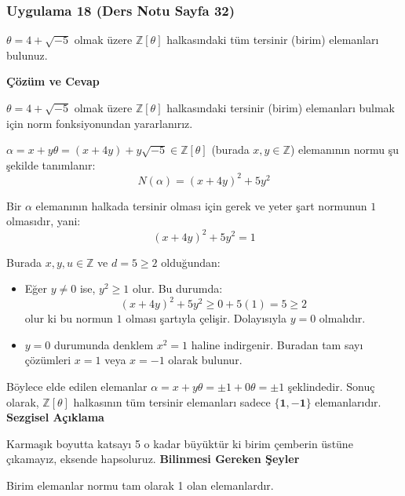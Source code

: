 \documentclass[11pt, a4paper]{article}
\newenvironment{cozum}{
    \vspace{0.5cm}
    \noindent\textcolor{green!60!black}{\faCheckCircle\enspace \textbf{\Large Çözüm ve Cevap}}\par\vspace{0.2cm}
}{}
\newenvironment{sezgisel}{
    \vspace{0.5cm}
    \noindent\textcolor{orange!80!black}{\faLightbulb\enspace \textbf{\Large Sezgisel Açıklama}}\par\vspace{0.2cm}
    \itshape
}{}
\newenvironment{bilgi}{
    \vspace{0.5cm}
    \noindent\textcolor{red!70!black}{\faExclamationTriangle\enspace \textbf{\Large Bilinmesi Gereken Şeyler}}\par\vspace{0.2cm}
}{}
\begin{document}
\subsubsection{Uygulama 18 (Ders Notu Sayfa 32)}
\begin{sorubox}
$\theta = 4 + \sqrt{-5}$ olmak üzere $\mathbb{Z}[\theta]$ halkasındaki tüm tersinir (birim) elemanları bulunuz.
\end{sorubox}
\begin{cozum}
$\theta = 4 + \sqrt{-5}$ olmak üzere $\mathbb{Z}[\theta]$ halkasındaki tersinir (birim) elemanları bulmak için norm fonksiyonundan yararlanırız.

$\alpha = x + y\theta = (x + 4y) + y\sqrt{-5} \in \mathbb{Z}[\theta]$ (burada $x, y \in \mathbb{Z}$) elemanının normu şu şekilde tanımlanır:
\[ N(\alpha) = (x + 4y)^2 + 5 y^2 \]

Bir $\alpha$ elemanının halkada tersinir olması için gerek ve yeter şart normunun $1$ olmasıdır, yani:
\[ (x + 4y)^2 + 5 y^2 = 1 \]

Burada $x, y, u \in \mathbb{Z}$ ve $d = 5 \ge 2$ olduğundan:
\begin{itemize}
    \item Eğer $y \neq 0$ ise, $y^2 \ge 1$ olur. Bu durumda:
    \[ (x + 4y)^2 + 5 y^2 \ge 0 + 5(1) = 5 \ge 2 \]
    olur ki bu normun $1$ olması şartıyla çelişir. Dolayısıyla $y = 0$ olmalıdır.
    \item $y = 0$ durumunda denklem $x^2 = 1$ haline indirgenir. Buradan tam sayı çözümleri $x = 1$ veya $x = -1$ olarak bulunur.
\end{itemize}

Böylece elde edilen elemanlar $\alpha = x + y\theta = \pm 1 + 0\theta = \pm 1$ şeklindedir. Sonuç olarak, $\mathbb{Z}[\theta]$ halkasının tüm tersinir elemanları sadece $\mathbf{\{1, -1\}}$ elemanlarıdır.
\end{cozum}
\begin{sezgisel}
Karmaşık boyutta katsayı 5 o kadar büyüktür ki birim çemberin üstüne çıkamayız, eksende hapsoluruz.
\end{sezgisel}
\begin{bilgi}
Birim elemanlar normu tam olarak 1 olan elemanlardır.
\end{bilgi}

\newpage
\end{document}
